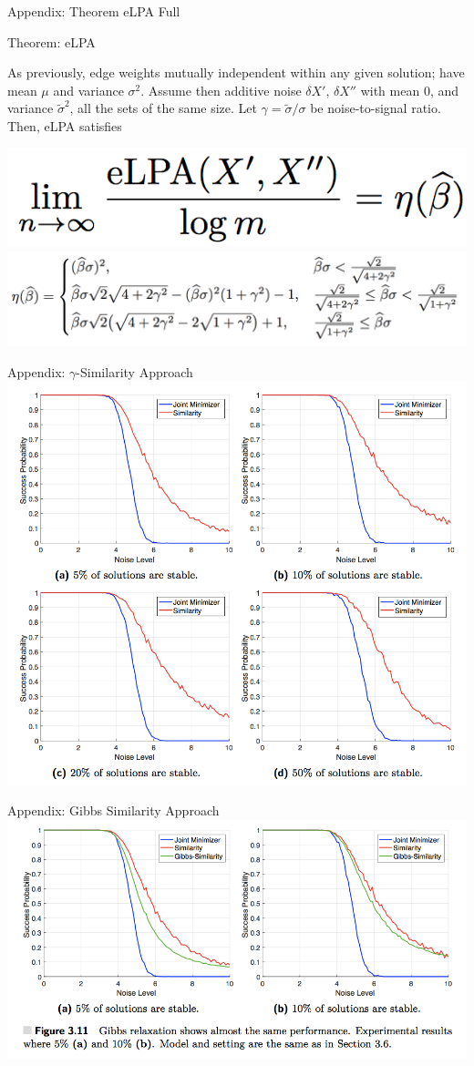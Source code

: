 \documentclass[presentation,12pt]{beamer}
\begin{document}
\begin{frame}{Appendix: Theorem eLPA Full}
  \begin{block}{\rule[-0.6ex]{0pt}{2.5ex}Theorem: eLPA}
  As previously, edge weights mutually independent
  within any given solution; have mean $\mu$ and variance $\sigma^2$. Assume
  then additive noise $\delta X'$, $\delta X''$ with mean $0$, and variance
  $\tilde{\sigma}^2$, all the sets of the same size. Let $\gamma
  = \tilde\sigma/\sigma$ be noise-to-signal ratio. Then, eLPA satisfies

  \centering
  \includegraphics[width=.4\textwidth]{elpa_1.png}\\
  \includegraphics[width=.9\textwidth]{elpa_2.png}
  \end{block}
\end{frame}

\begin{frame}{Appendix: $\gamma$-Similarity Approach}
  \centering
  \includegraphics[width=.8\textwidth]{proof-of-concept.png}
\end{frame}

\begin{frame}{Appendix: Gibbs Similarity Approach}
  \centering
  \includegraphics[width=.8\textwidth]{gibbs-proof-of-concept.png}
\end{frame}
\end{document}
